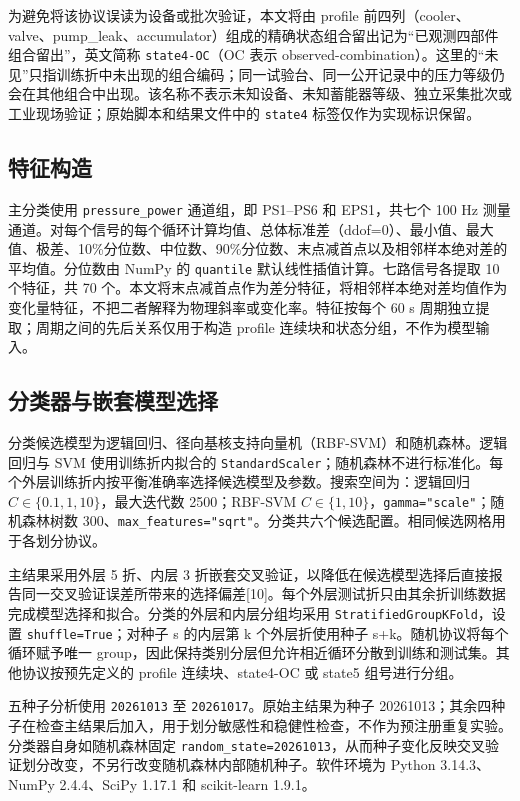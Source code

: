 \documentclass[UTF8,12pt,a4paper]{ctexart}
\begin{document}
为避免将该协议误读为设备或批次验证，本文将由 profile 前四列（cooler、valve、pump\_leak、accumulator）组成的精确状态组合留出记为“已观测四部件组合留出”，英文简称 \texttt{state4-OC}（OC 表示 observed-combination）。这里的“未见”只指训练折中未出现的组合编码；同一试验台、同一公开记录中的压力等级仍会在其他组合中出现。该名称不表示未知设备、未知蓄能器等级、独立采集批次或工业现场验证；原始脚本和结果文件中的 \texttt{state4} 标签仅作为实现标识保留。

\subsection{特征构造}
主分类使用 \texttt{pressure\_power} 通道组，即 PS1–PS6 和 EPS1，共七个 100 Hz 测量通道。对每个信号的每个循环计算均值、总体标准差（ddof=0）、最小值、最大值、极差、10\%分位数、中位数、90\%分位数、末点减首点以及相邻样本绝对差的平均值。分位数由 NumPy 的 \texttt{quantile} 默认线性插值计算。七路信号各提取 10 个特征，共 70 个。本文将末点减首点作为差分特征，将相邻样本绝对差均值作为变化量特征，不把二者解释为物理斜率或变化率。特征按每个 60 s 周期独立提取；周期之间的先后关系仅用于构造 profile 连续块和状态分组，不作为模型输入。

\subsection{分类器与嵌套模型选择}
分类候选模型为逻辑回归、径向基核支持向量机（RBF-SVM）和随机森林。逻辑回归与 SVM 使用训练折内拟合的 \texttt{StandardScaler}；随机森林不进行标准化。每个外层训练折内按平衡准确率选择候选模型及参数。搜索空间为：逻辑回归 $C\in\{0.1, 1, 10\}$，最大迭代数 2500；RBF-SVM $C\in\{1, 10\}$，\texttt{gamma="scale"}；随机森林树数 300、\texttt{max\_features="sqrt"}。分类共六个候选配置。相同候选网格用于各划分协议。

主结果采用外层 5 折、内层 3 折嵌套交叉验证，以降低在候选模型选择后直接报告同一交叉验证误差所带来的选择偏差[10]。每个外层测试折只由其余折训练数据完成模型选择和拟合。分类的外层和内层分组均采用 \texttt{StratifiedGroupKFold}，设置 \texttt{shuffle=True}；对种子 s 的内层第 k 个外层折使用种子 s+k。随机协议将每个循环赋予唯一 group，因此保持类别分层但允许相近循环分散到训练和测试集。其他协议按预先定义的 profile 连续块、state4-OC 或 state5 组号进行分组。

五种子分析使用 \texttt{20261013} 至 \texttt{20261017}。原始主结果为种子 20261013；其余四种子在检查主结果后加入，用于划分敏感性和稳健性检查，不作为预注册重复实验。分类器自身如随机森林固定 \texttt{random\_state=20261013}，从而种子变化反映交叉验证划分改变，不另行改变随机森林内部随机种子。软件环境为 Python 3.14.3、NumPy 2.4.4、SciPy 1.17.1 和 scikit-learn 1.9.1。
\end{document}
